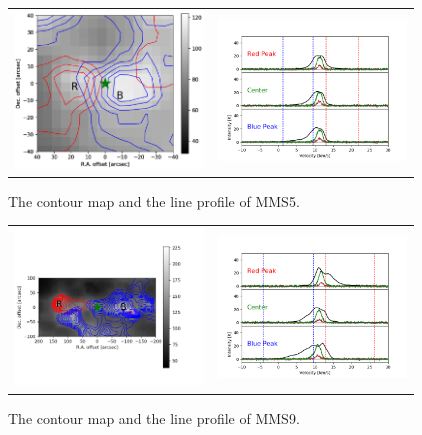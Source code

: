 \documentclass[twoside,11pt]{gshs_thesis}
\begin{document}
\begin{figure}[h!]
	\begin{center}
		\begin{tabular}{cc}
			\includegraphics[width=5cm]{Orion_12CO2-1_MMS5_rbcontour_400_modified.png} &   \includegraphics[width=5cm]{Orion_12CO2-1_MMS5_line_profile_400.png} \\
		\end{tabular}
		\label{MMS521}
		\caption{The contour map and the line profile of MMS5. }
	\end{center}
\end{figure}
\clearpage
\newpage
\begin{figure}[h!]
	\begin{center}
		\begin{tabular}{cc}
			\includegraphics[width=5cm]{Orion_12CO2-1_MMS9_rbcontour_400_modified.png} &   \includegraphics[width=5cm]{Orion_12CO2-1_MMS9_line_profile_400.png} \\
		\end{tabular}
		\label{MMS921}
		\caption{The contour map and the line profile of MMS9. }
	\end{center}
\end{figure}
\end{document}
